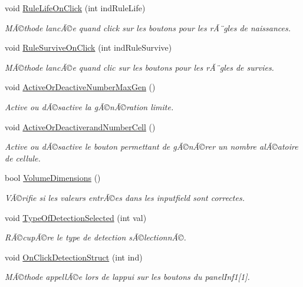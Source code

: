 \begin{DoxyCompactItemize}
void \mbox{\hyperlink{class_parameters_ae90c0f90420620d98950ac50b9f24782}{Rule\+Life\+On\+Click}} (int ind\+Rule\+Life)
\begin{DoxyCompactList}\small\item\em MÃ©thode lancÃ©e quand click sur les boutons pour les rÃ¨gles de naissances. \end{DoxyCompactList}\item 
void \mbox{\hyperlink{class_parameters_af62c0383d55e0653fcd2384b9d49d42f}{Rule\+Survive\+On\+Click}} (int ind\+Rule\+Survive)
\begin{DoxyCompactList}\small\item\em MÃ©thode lancÃ©e quand clic sur les boutons pour les rÃ¨gles de survies. \end{DoxyCompactList}\item 
void \mbox{\hyperlink{class_parameters_a1db238650db0f62fade69c0da51a0e83}{Active\+Or\+Deactive\+Number\+Max\+Gen}} ()
\begin{DoxyCompactList}\small\item\em Active ou dÃ©sactive la gÃ©nÃ©ration limite. \end{DoxyCompactList}\item 
void \mbox{\hyperlink{class_parameters_af21422abe34305567b0d9ef4982c9ea8}{Active\+Or\+Deactiverand\+Number\+Cell}} ()
\begin{DoxyCompactList}\small\item\em Active ou dÃ©sactive le bouton permettant de gÃ©nÃ©rer un nombre alÃ©atoire de cellule. \end{DoxyCompactList}\item 
bool \mbox{\hyperlink{class_parameters_a92f68fa9992b1066153a6175dd37dc36}{Volume\+Dimensions}} ()
\begin{DoxyCompactList}\small\item\em VÃ©rifie si les valeurs entrÃ©es dans les inputfield sont correctes. \end{DoxyCompactList}\item 
void \mbox{\hyperlink{class_parameters_aea7e3963fed0681d7a9f756a5deb52d1}{Type\+Of\+Detection\+Selected}} (int val)
\begin{DoxyCompactList}\small\item\em RÃ©cupÃ©re le type de detection sÃ©lectionnÃ©. \end{DoxyCompactList}\item 
void \mbox{\hyperlink{class_parameters_ad62219d943618c3b970a46239ae443ae}{On\+Click\+Detection\+Struct}} (int ind)
\begin{DoxyCompactList}\small\item\em MÃ©thode appellÃ©e lors de l\textquotesingle{}appui sur les boutons du panel\+Inf1\mbox{[}1\mbox{]}. \end{DoxyCompactList}\item 

\end{DoxyCompactItemize}
